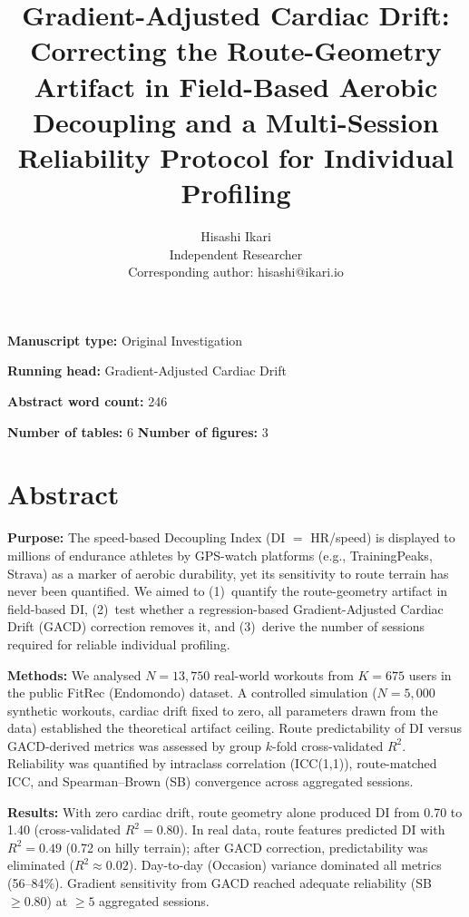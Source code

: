 \documentclass[12pt]{article}
\title{Gradient-Adjusted Cardiac Drift: Correcting the Route-Geometry
Artifact in Field-Based Aerobic Decoupling and a Multi-Session
Reliability Protocol for Individual Profiling}
\author{Hisashi Ikari\\
\small Independent Researcher\\
\small Corresponding author: hisashi@ikari.io}
\date{}
\begin{document}
\maketitle

\noindent\textbf{Manuscript type:} Original Investigation

\noindent\textbf{Running head:} Gradient-Adjusted Cardiac Drift

\noindent\textbf{Abstract word count:} 246

\noindent\textbf{Number of tables:} 6 \qquad \textbf{Number of figures:} 3

\vspace{1em}

\section*{Abstract}
\noindent\textbf{Purpose:} The speed-based Decoupling Index (DI $=$ HR/speed)
is displayed to millions of endurance athletes by GPS-watch platforms
(e.g., TrainingPeaks, Strava) as a marker of aerobic durability, yet its
sensitivity to route terrain has never been quantified. We aimed to
(1)~quantify the route-geometry artifact in field-based DI, (2)~test
whether a regression-based Gradient-Adjusted Cardiac Drift (GACD)
correction removes it, and (3)~derive the number of sessions required
for reliable individual profiling.

\noindent\textbf{Methods:} We analysed $N = 13{,}750$ real-world workouts
from $K = 675$ users in the public FitRec (Endomondo) dataset. A
controlled simulation ($N = 5{,}000$ synthetic workouts, cardiac drift
fixed to zero, all parameters drawn from the data) established the
theoretical artifact ceiling. Route predictability of DI versus
GACD-derived metrics was assessed by group $k$-fold cross-validated
$R^2$. Reliability was quantified by intraclass correlation
(ICC(1,1)), route-matched ICC, and Spearman--Brown (SB) convergence
across aggregated sessions.

\noindent\textbf{Results:} With zero cardiac drift, route geometry alone
produced DI from 0.70 to 1.40 (cross-validated $R^2 = 0.80$). In real
data, route features predicted DI with $R^2 = 0.49$ (0.72 on hilly
terrain); after GACD correction, predictability was eliminated
($R^2 \approx 0.02$). Day-to-day (Occasion) variance dominated all
metrics (56--84\%). Gradient sensitivity from GACD reached adequate
reliability (SB $\geq 0.80$) at $\geq 5$ aggregated sessions.
\end{document}
